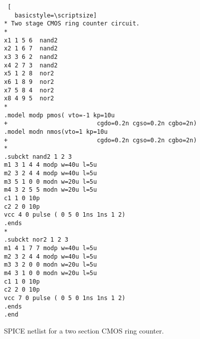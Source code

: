 \begin{figure}
 \begin{lstlisting} [
   basicstyle=\scriptsize]   
* Two stage CMOS ring counter circuit.
*
x1 1 5 6  nand2
x2 1 6 7  nand2
x3 3 6 2  nand2
x4 2 7 3  nand2
x5 1 2 8  nor2
x6 1 8 9  nor2
x7 5 8 4  nor2
x8 4 9 5  nor2
*
.model modp pmos( vto=-1 kp=10u
+                         cgdo=0.2n cgso=0.2n cgbo=2n)
.model modn nmos(vto=1 kp=10u
+                         cgdo=0.2n cgso=0.2n cgbo=2n)
*
.subckt nand2 1 2 3 
m1 3 1 4 4 modp w=40u l=5u
m2 3 2 4 4 modp w=40u l=5u
m3 5 1 0 0 modn w=20u l=5u
m4 3 2 5 5 modn w=20u l=5u
c1 1 0 10p
c2 2 0 10p
vcc 4 0 pulse ( 0 5 0 1ns 1ns 1 2)
.ends
*
.subckt nor2 1 2 3
m1 4 1 7 7 modp w=40u l=5u
m2 3 2 4 4 modp w=40u l=5u
m3 3 2 0 0 modn w=20u l=5u
m4 3 1 0 0 modn w=20u l=5u
c1 1 0 10p
c2 2 0 10p
vcc 7 0 pulse ( 0 5 0 1ns 1ns 1 2)
.ends
.end
\end{lstlisting} 
 \caption{SPICE netlist for a two section CMOS ring counter.}
\label{fig:stoq_fig11}
\end{figure}   

